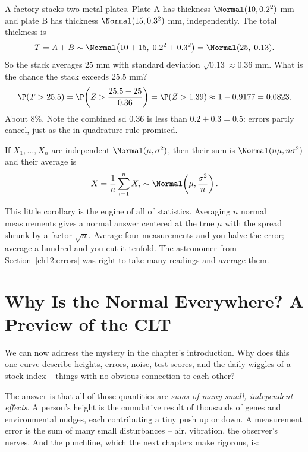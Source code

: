 \begin{example}
\label{ch12:ex-stack}
A factory stacks two metal plates. Plate A has thickness $\Normal(10, 0.2^2)$ mm
and plate B has thickness $\Normal(15, 0.3^2)$ mm, independently. The total
thickness is
\[
  T = A + B \sim \Normal\big(10+15,\; 0.2^2 + 0.3^2\big) = \Normal(25,\; 0.13).
\]
So the stack averages $25$ mm with standard deviation $\sqrt{0.13}\approx 0.36$ mm.
What is the chance the stack exceeds $25.5$ mm?
\[
  \P(T > 25.5) = \P\!\left(Z > \frac{25.5 - 25}{0.36}\right)
              = \P(Z > 1.39) \approx 1 - 0.9177 = 0.0823.
\]
About $8\%$. Note the combined sd $0.36$ is less than $0.2 + 0.3 = 0.5$: errors
partly cancel, just as the in-quadrature rule promised.
\end{example}

\begin{corollary}
\label{ch12:cor-average}
If $X_1,\dots,X_n$ are independent $\Normal(\mu,\sigma^2)$, then their sum is
$\Normal(n\mu, n\sigma^2)$ and their average is
\[
  \bar X = \frac{1}{n}\sum_{i=1}^n X_i \sim \Normal\!\left(\mu, \frac{\sigma^2}{n}\right).
\]
\end{corollary}

This little corollary is the engine of all of statistics. Averaging $n$ normal
measurements gives a normal answer centered at the true $\mu$ with the spread
shrunk by a factor $\sqrt{n}$. Average four measurements and you halve the error;
average a hundred and you cut it tenfold. The astronomer from
Section~\ref{ch12:errors} was right to take many readings and average them.

\section{Why Is the Normal Everywhere? A Preview of the CLT}
\label{ch12:everywhere}

We can now address the mystery in the chapter's introduction. Why does this one
curve describe heights, errors, noise, test scores, and the daily wiggles of a
stock index -- things with no obvious connection to each other?

The answer is that all of those quantities are \emph{sums of many small,
independent effects}. A person's height is the cumulative result of thousands of
genes and environmental nudges, each contributing a tiny push up or down. A
measurement error is the sum of many small disturbances -- air, vibration, the
observer's nerves. And the punchline, which the next chapters make rigorous, is:

